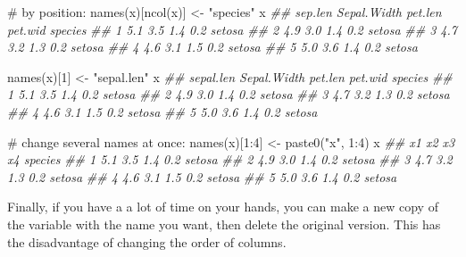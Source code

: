 \documentclass[
  13,
  letterpaper,
]{report}
\newenvironment{Shaded}{\begin{snugshade}}{\end{snugshade}}
\newcommand{\CommentTok}[1]{\textcolor[rgb]{0.37,0.37,0.37}{#1}}
\newcommand{\ConstantTok}[1]{\textcolor[rgb]{0.56,0.35,0.01}{#1}}
\newcommand{\DecValTok}[1]{\textcolor[rgb]{0.68,0.00,0.00}{#1}}
\newcommand{\DocumentationTok}[1]{\textcolor[rgb]{0.37,0.37,0.37}{\textit{#1}}}
\newcommand{\FunctionTok}[1]{\textcolor[rgb]{0.28,0.35,0.67}{#1}}
\newcommand{\NormalTok}[1]{\textcolor[rgb]{0.00,0.23,0.31}{#1}}
\newcommand{\OtherTok}[1]{\textcolor[rgb]{0.00,0.23,0.31}{#1}}
\newcommand{\SpecialCharTok}[1]{\textcolor[rgb]{0.37,0.37,0.37}{#1}}
\newcommand{\StringTok}[1]{\textcolor[rgb]{0.13,0.47,0.30}{#1}}
\begin{document}
\begin{Shaded}
\begin{Highlighting}[]
\CommentTok{\# by position:}
\FunctionTok{names}\NormalTok{(x)[}\FunctionTok{ncol}\NormalTok{(x)] }\OtherTok{\textless{}{-}} \StringTok{"species"}
\NormalTok{x}
\DocumentationTok{\#\#   sep.len Sepal.Width pet.len pet.wid species}
\DocumentationTok{\#\# 1     5.1         3.5     1.4     0.2  setosa}
\DocumentationTok{\#\# 2     4.9         3.0     1.4     0.2  setosa}
\DocumentationTok{\#\# 3     4.7         3.2     1.3     0.2  setosa}
\DocumentationTok{\#\# 4     4.6         3.1     1.5     0.2  setosa}
\DocumentationTok{\#\# 5     5.0         3.6     1.4     0.2  setosa}

\FunctionTok{names}\NormalTok{(x)[}\DecValTok{1}\NormalTok{] }\OtherTok{\textless{}{-}} \StringTok{"sepal.len"}
\NormalTok{x}
\DocumentationTok{\#\#   sepal.len Sepal.Width pet.len pet.wid species}
\DocumentationTok{\#\# 1       5.1         3.5     1.4     0.2  setosa}
\DocumentationTok{\#\# 2       4.9         3.0     1.4     0.2  setosa}
\DocumentationTok{\#\# 3       4.7         3.2     1.3     0.2  setosa}
\DocumentationTok{\#\# 4       4.6         3.1     1.5     0.2  setosa}
\DocumentationTok{\#\# 5       5.0         3.6     1.4     0.2  setosa}

\CommentTok{\# change several names at once:}
\FunctionTok{names}\NormalTok{(x)[}\DecValTok{1}\SpecialCharTok{:}\DecValTok{4}\NormalTok{] }\OtherTok{\textless{}{-}} \FunctionTok{paste0}\NormalTok{(}\StringTok{"x"}\NormalTok{, }\DecValTok{1}\SpecialCharTok{:}\DecValTok{4}\NormalTok{)}
\NormalTok{x}
\DocumentationTok{\#\#    x1  x2  x3  x4 species}
\DocumentationTok{\#\# 1 5.1 3.5 1.4 0.2  setosa}
\DocumentationTok{\#\# 2 4.9 3.0 1.4 0.2  setosa}
\DocumentationTok{\#\# 3 4.7 3.2 1.3 0.2  setosa}
\DocumentationTok{\#\# 4 4.6 3.1 1.5 0.2  setosa}
\DocumentationTok{\#\# 5 5.0 3.6 1.4 0.2  setosa}
\end{Highlighting}
\end{Shaded}

Finally, if you have a a lot of time on your hands, you can make a new
copy of the variable with the name you want, then delete the original
version. This has the disadvantage of changing the order of columns.

\begin{Shaded}
\end{Shaded}
\end{document}
